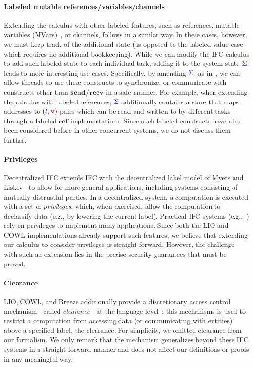 \documentclass{sigplanconf}
\begin{document}
\paragraph{Labeled mutable references/variables/channels}
%
Extending the calculus with other labeled features, such as
references, mutable variables (MVars)~\cite{CH96}, or channels,
follows in a similar way.
%
In these cases, however, we must keep track of the additional state
(as opposed to the labeled value case which requires no additional
bookkeeping).
%
While we can modify the IFC calculus to add such labeled state to each
individual task, adding it to the system state \ensuremath{\ifc{\Sigma}} leads to more
interesting use cases.
%
Specifically, by amending \ensuremath{\ifc{\Sigma}}, as in~\cite{lio,
stefan:addressing-covert}, we can allow threads to use these
constructs to synchronize, or communicate with constructs other than
\ensuremath{\mathbf{send}}/\ensuremath{\mathbf{recv}} in a safe manner.
%
For example, when extending the calculus with labeled references, \ensuremath{\ifc{\Sigma}}
additionally contains a store that maps addresses to \ensuremath{(\ifc{l},\tar{v})} pairs
which can be read and written to by different tasks through a labeled
\ensuremath{\mathbf{ref}} implementations.
%
Since such labeled constructs have also been considered before in other
concurrent systems, we do not discuss them further.

\paragraph{Privileges}
Decentralized IFC extends IFC with the decentralized label model of
Myers and Liskov~\cite{myers:dlm} to allow for more general
applications, including systems consisting of mutually distrustful
parties.  In a decentralized system, a computation is executed with a
set of \emph{privileges}, which, when exercised, allow the computation
to declassify data (e.g., by lowering the current label).
%
Practical IFC systems
(e.g.,~\cite{Zeldovich:2006, lio,
Hritcu:2013:YIB:2497621.2498098, myers:jif}) rely on privileges to
implement many applications.
%
Since both the LIO and COWL implementations already support such features,
we believe that extending our calculus to consider privileges is
straight forward.
%
However, the challenge with such an extension lies in the precise
security guarantees that must be proved.
%

\paragraph{Clearance}
%
LIO, COWL, and Breeze additionally provide a discretionary access
control mechanism---called \emph{clearance}---at the language
level~\cite{Hritcu:2013:YIB:2497621.2498098, lio}; this mechanisms is
used to restrict a computation from accessing data (or communicating
with entities) above a specified label, the clearance.
%
For simplicity, we omitted clearance from our formalism.
%
We only remark that the mechanism generalizes beyond these IFC systems
in a straight forward manner and does not affect our definitions or
proofs in any meaningful way.
\end{document}
